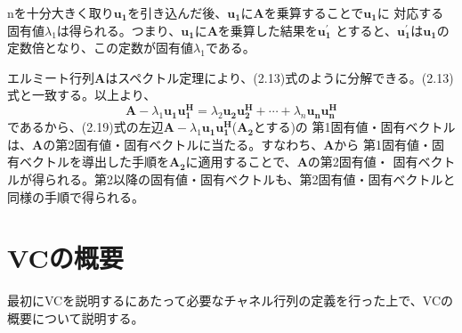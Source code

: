 nを十分大きく取り$\bm{u_1}$を引き込んだ後、$\bm{u_1}$に$\bm{A}$を乗算することで$\bm{u_1}$に
対応する固有値$\lambda_1$は得られる。つまり、$\bm{u_1}$に$\bm{A}$を乗算した結果を$\bm{u_1^{\prime}}$
とすると、$\bm{u_1^{\prime}}$は$\bm{u_1}$の定数倍となり、この定数が固有値$\lambda_1$である。

エルミート行列$\bm{A}$はスペクトル定理により、(2.13)式のように分解できる。(2.13)式と一致する。以上より、
\begin{equation}
    \bm{A} - \lambda_1\bm{u_1}\bm{u_1^H} = \lambda_2\bm{u_2}\bm{u_2^H} + \cdots + \lambda_n\bm{u_n}\bm{u_n^H}
\end{equation}
であるから、(2.19)式の左辺$\bm{A} - \lambda_1\bm{u_1}\bm{u_1^H}$($\bm{A_2}$とする)の
第1固有値・固有ベクトルは、$\bm{A}$の第2固有値・固有ベクトルに当たる。すなわち、$\bm{A}$から
第1固有値・固有ベクトルを導出した手順を$\bm{A_2}$に適用することで、$\bm{A}$の第2固有値・
固有ベクトルが得られる。第2以降の固有値・固有ベクトルも、第2固有値・固有ベクトルと同様の手順で得られる。

\section{VCの概要}
最初にVCを説明するにあたって必要なチャネル行列の定義を行った上で、VCの概要について説明する。

